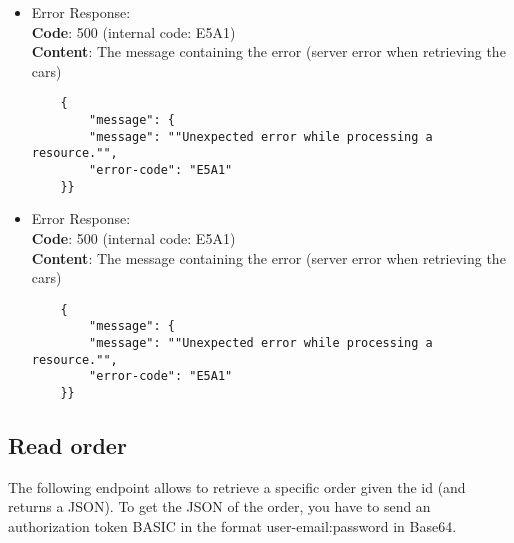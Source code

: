\begin{itemize}
\begin{verbatim}
		  
	\end{verbatim}
    \item Error Response:\\
    \textbf{Code}: 500 (internal code: E5A1)\\
    \textbf{Content}: The message containing the error (server error when retrieving the cars)\\
    \begin{verbatim}
    {
        "message": {
        "message": ""Unexpected error while processing a resource."",
        "error-code": "E5A1"
    }}
    \end{verbatim}
    \item Error Response:\\
    \textbf{Code}: 500 (internal code: E5A1)\\
    \textbf{Content}: The message containing the error (server error when retrieving the cars)\\
    \begin{verbatim}
    {
        "message": {
        "message": ""Unexpected error while processing a resource."",
        "error-code": "E5A1"
    }}
    \end{verbatim}

\end{itemize}

\subsection*{Read order}

The following endpoint allows to retrieve a specific order given the id (and returns a JSON). To get the JSON of the order, you have to send an authorization token BASIC in the format user-email:password in Base64.

